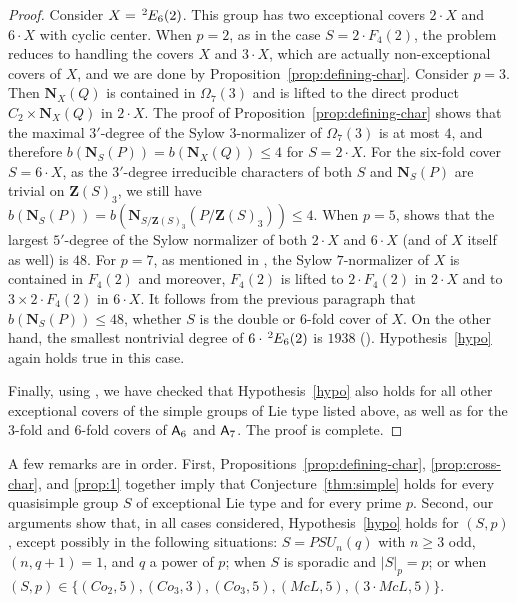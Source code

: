 \documentclass[12pt]{amsart}
\theoremstyle{plain}
\theoremstyle{definition}
\numberwithin{equation}{section}
\newcommand{\bN}{\mathbf{N}}
\newcommand{\ta}{\hspace{0.5mm}^{2}\hspace*{-0.2mm}}
\newcommand{\bZ}{{\mathbf{Z}}}
\newcommand{\Al}{\textup{\textsf{A}}}
\begin{document}
\begin{proof}
Consider $X=\ta E_6(2)$. This group has two exceptional covers
$2\cdot X$ and $6\cdot X$ with cyclic center. %
When $p=2$, as in the case $S=2\cdot F_4(2)$, the problem reduces to
handling the covers $X$ and $3\cdot X$, which are actually
non-exceptional covers of $X$, and we are done by
Proposition~\ref{prop:defining-char}. Consider $p=3$. Then
$\bN_X(Q)$ is contained in $\Omega_7(3)$ and is lifted to the direct
product $C_2\times \bN_X(Q)$ in $2\cdot X$. The proof of
Proposition~\ref{prop:defining-char} shows that the maximal
$3'$-degree of the Sylow $3$-normalizer of $\Omega_7(3)$ is at most
$4$, and therefore $b(\bN_S(P))=b(\bN_X(Q))\leq 4$ for $S=2\cdot X$.
For the six-fold cover $S=6\cdot X$, as the $3'$-degree irreducible
characters of both $S$ and $\bN_S(P)$ are trivial on $\bZ(S)_3$, we
still have $b(\bN_S(P))=b(\bN_{S/\bZ(S)_3}(P/\bZ(S)_3))\leq 4$. When
$p=5$, \cite[Table~2]{Malle08} shows that the largest $5'$-degree of
the Sylow normalizer of both $2\cdot X$ and $6\cdot X$ (and of $X$
itself as well) is $48$. %
For $p=7$, as mentioned in \cite[\S4]{Malle08}, the
Sylow $7$-normalizer of $X$ is contained in $F_4(2)$ and moreover,
$F_4(2)$ is lifted to $2\cdot F_4(2)$ in $2\cdot X$ and to $3\times
2\cdot F_4(2)$ in $6\cdot X$. It follows from the previous paragraph
that $b(\bN_S(P))\leq 48$, whether $S$ is the double or 6-fold cover
of $X$. On the other hand, the smallest nontrivial degree of $6\cdot
\ta E_6(2)$ is $1938$ (\cite{GAP}). Hypothesis~\ref{hypo} again
holds true in this case.

Finally, using \cite{GAP}, we have checked that
Hypothesis~\ref{hypo} also holds for all other exceptional covers of
the simple groups of Lie type listed above, as well as for the
3-fold and 6-fold covers of $\Al_6$ and $\Al_7$. The proof is
complete.
\end{proof}

A few remarks are in order. First,
Propositions~\ref{prop:defining-char}, \ref{prop:cross-char}, and
\ref{prop:1} together imply that Conjecture~\ref{thm:simple} holds
for every quasisimple group \(S\) of exceptional Lie type and for
every prime \(p\). Second, our arguments show that, in all cases
considered, Hypothesis~\ref{hypo} holds for \((S,p)\), except
possibly in the following situations: \(S=PSU_n(q)\) with \(n\ge 3\)
odd, \((n,q+1)=1\), and \(q\) a power of \(p\); when $S$ is sporadic
and $|S|_p=p$; or when $(S,p)\in\{(Co_2,5), (Co_3,3), (Co_3,5),
(McL,5), (3\cdot McL,5)\}$.
\end{document}
